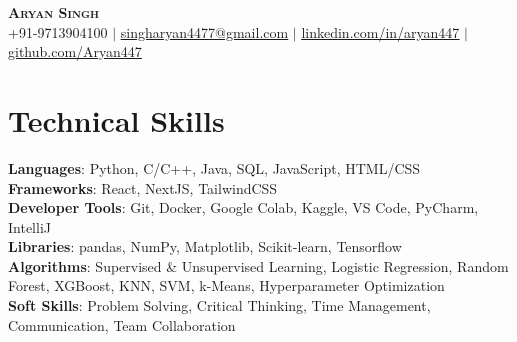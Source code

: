 \documentclass[letterpaper,11pt]{article}
\begin{document}

\begin{center}
    \textbf{\Huge \scshape Aryan Singh} \\ \vspace{1pt}
    \small +91-9713904100 $|$ \href{singharyan4477@gmail.com}{\underline{singharyan4477@gmail.com}} $|$
    \href{https://linkedin.com/in/aryan447/}{\underline{linkedin.com/in/aryan447}} $|$
    \href{https://github.com/Aryan447}{\underline{github.com/Aryan447}}
\end{center}

\section{Technical Skills}
 \begin{itemize}[leftmargin=0.15in, label={}]
    \small{\item{
     \textbf{Languages}{: Python, C/C++, Java, SQL, JavaScript, HTML/CSS} \\
     \textbf{Frameworks}{: React, NextJS, TailwindCSS} \\
     \textbf{Developer Tools}{: Git, Docker, Google Colab, Kaggle, VS Code, PyCharm, IntelliJ} \\
     \textbf{Libraries}{: pandas, NumPy, Matplotlib, Scikit-learn, Tensorflow}
    } \\
    \textbf{Algorithms}{: Supervised \& Unsupervised Learning, Logistic Regression, Random Forest, XGBoost, KNN, SVM, k-Means, Hyperparameter Optimization} \\
    \textbf{Soft Skills}{: Problem Solving, Critical Thinking, Time Management, Communication, Team Collaboration}
  }
 \end{itemize}


\end{document}
